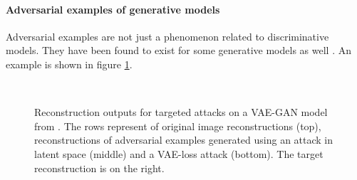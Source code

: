\documentclass[oneside]{book}
\begin{document}
\paragraph{Adversarial examples of generative models} Adversarial examples are not just a phenomenon related to discriminative models. They have been found to exist for some generative models as well \citep{Goodfellow:2014:EHAE,Kos:2018:AEGM}. An example is shown in figure \ref{fig:vae-gan-targetad-face}.

\begin{figure}[htbp!]
	\begin{center}
		~
	\end{center}
	\caption{Reconstruction outputs for targeted attacks on a VAE-GAN model from \citet{Kos:2018:AEGM}. The rows represent of original image reconstructions (top), reconstructions of adversarial examples generated using an attack in latent space (middle) and a VAE-loss attack (bottom). The target reconstruction is on the right.}
	\label{fig:vae-gan-targetad-face}
\end{figure}
\end{document}
